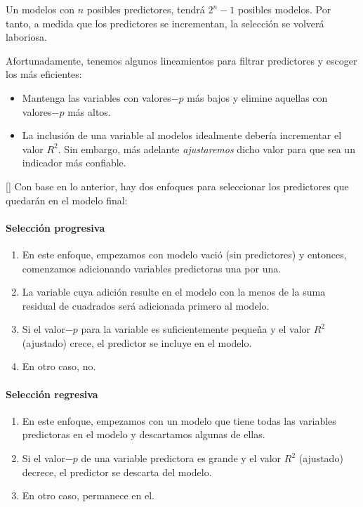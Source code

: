 \begin{observacion}
	Un modelos con $n$ posibles predictores, tendrá $2^{n}-1$ posibles modelos. Por tanto, a medida que los predictores se incrementan, la selección se volverá laboriosa.
\end{observacion}



Afortunadamente, tenemos algunos lineamientos para filtrar predictores y escoger los más eficientes:
\begin{itemize}
	\item Mantenga las variables con valores$-p$ más bajos y elimine aquellas con valores$-p$ más altos. 
	\item La inclusión de una variable al modelos idealmente debería incrementar el valor $R^{2}.$  Sin embargo, más adelante \emph{ajustaremos} dicho valor para que sea un indicador más confiable.
\end{itemize}


[]{}
Con base en lo anterior, hay dos enfoques para seleccionar los predictores que quedarán en el modelo final:


\paragraph{Selección progresiva}
\begin{enumerate}
	\item En este enfoque, empezamos con modelo vació (sin predictores) y entonces, comenzamos adicionando variables predictoras una por una. 
	\item La variable cuya adición resulte en el modelo con la menos de la suma residual de cuadrados será adicionada primero al modelo. \item Si el valor$-p$ para la variable es suficientemente pequeña y el valor $R^{2}$ (ajustado) crece, el predictor se incluye en el modelo. 
	\item En otro caso, no.
\end{enumerate}


\paragraph{Selección regresiva}
\begin{enumerate}
	\item En este enfoque, empezamos con un modelo que tiene todas las variables predictoras en el modelo y descartamos algunas de ellas.
	
	
	\item Si el valor$-p$ de una variable predictora es grande y el valor $R^{2}$ (ajustado) decrece, el predictor se descarta del modelo.
	
	
	
	\item En otro caso, permanece en el.
\end{enumerate}



